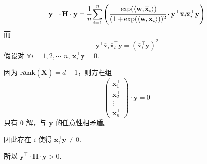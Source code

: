 \documentclass[11pt,letter,notitlepage]{article}
\newcommand{\rank}[1]{ \textbf{rank}  (#1)  }
\begin{document}
\begin{solution}
\begin{enumerate}
		      $$
			      \mathbf{y}^\top\cdot \mathbf{H}\cdot \mathbf{y}
			      = \cfrac{1}{n}\sum_{i=1}^{n}{\left(
			      \cfrac{\exp(\langle \textbf{w},  \overline{\mathbf{x}}_i \rangle)}{(1+\exp(\langle \textbf{w},  \overline{\mathbf{x}}_i \rangle))^2}\cdot \mathbf{y}^\top\overline{\mathbf{x}}_{i}\overline{\mathbf{x}}_{i}^\top\mathbf{y}
			      \right)}
		      $$
		      而
		      $$\mathbf{y}^\top\overline{\mathbf{x}}_{i}\overline{\mathbf{x}}_{i}^\top\mathbf{y}=\left(\overline{\mathbf{x}}_{i}^\top\mathbf{y}\right)^2$$
		      假设对 $\forall i =1,2,\cdots,n$, $\overline{\mathbf{x}}_{i}^\top\mathbf{y}=0$.

		      因为 $\rank{\overline{\mathbf{X}}}=d+1$，则方程组
		      $$\begin{pmatrix}
				      \overline{\mathbf{x}}_{1}^\top \\
				      \overline{\mathbf{x}}_{2}^\top \\
				      \vdots                         \\
				      \overline{\mathbf{x}}_{n}^\top
			      \end{pmatrix}\cdot \mathbf{y}=0$$
		      只有 $\mathbf{0}$ 解，与 $\mathbf{y}$ 的任意性相矛盾。

		      因此存在 $i$ 使得 $\overline{\mathbf{x}}_{i}^\top\mathbf{y}\neq0$.

		      所以 $\mathbf{y}^\top\cdot \mathbf{H}\cdot \mathbf{y}>0$.


\end{enumerate}
\end{solution}
\end{document}
